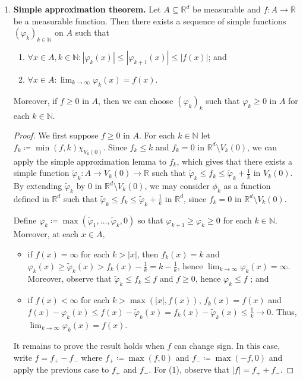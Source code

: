 \begin{enumerate}
\begin{proof}
	\end{proof}
\item \textbf{Simple approximation theorem.} Let \( A \subseteq \mathbb{R}^{d}  \) be measurable and \( f : A \to \overline{\mathbb{R}} \) be a measurable function. Then there exists a sequence of simple functions \( (\varphi _k)_{k \in \mathbb{N} }  \) on \( A \) such that
\begin{enumerate}
	\item \(\forall x \in A, k \in \mathbb{N} : |\varphi _k(x)| \leq |\varphi _{k+1}(x) | \leq |f(x)| \); and
	\item \(\forall x \in A : \lim_{{k} \to {\infty}} \varphi _k(x) = f(x) \).
\end{enumerate}
Moreover, if \( f \geq 0 \) in \( A \), then we can choose \(( \varphi _k )_k\) such that \( \varphi _k \geq 0 \) in \( A \) for each \( k \in \mathbb{N}  \).
\begin{proof}\renewcommand{\qedsymbol}{}
We first suppose \( f \geq 0 \) in \( A \). For each \( k \in \mathbb{N}  \) let \( f_k\coloneqq \min (f,k)\chi_{V_{k} (0)}  \). Since \( f_k \leq k  \) and \( f_k = 0 \) in \( \mathbb{R}^{d} \setminus V_k(0) \), we can apply the simple approximation lemma to \( f_k \), which gives that there exists a simple function \( \tilde{\varphi}_k : A \to V_k(0) \to \mathbb{R} \) such that \( \tilde{\varphi}_k \leq f_k \leq \tilde{\varphi}_k + \frac{1}{k}  \) in \( V_k(0). \) By extending \( \tilde{\varphi}_k \) by 0 in \( \mathbb{R}^{d} \setminus V_k(0) \), we may consider \( \phi_k \) as a function defined in \( \mathbb{R}^{d}  \) such that \( \tilde{\varphi}_k \leq f_k \leq \tilde{\varphi}_k + \frac{1}{k}  \) in \( \mathbb{R}^{d}  \), since \( f_k = 0 \) in \( \mathbb{R}^{d} \setminus V_k(0) \).

Define \( \varphi _k \coloneqq \max (\tilde{\varphi}_1, \hdots , \tilde{\varphi}_k , 0) \) so that \( \varphi_{k+1} \geq \varphi _k \geq 0   \) for each \( k \in \mathbb{N}  \). Moreover, at each \(x \in A,\)
\begin{itemize}
	\item if \( f(x) = \infty \) for each \( k > |x| \), then \( f_k(x) = k \) and \( \varphi _k (x) \geq \tilde{\varphi }_k(x) > f_k(x) - \frac{1}{k} = k - \frac{1}{k}  \), hence \( \lim_{{k} \to {\infty}} \varphi _k (x) = \infty \). Moreover, observe that \( \tilde{\varphi }_k \leq f _k \leq f \) and \( f \geq 0 \), hence \( \varphi _k \leq f \)  ; and
	\item if \( f(x) < \infty \) for each \( k > \max (|x|, f(x)) \), \( f_k(x) = f(x) \) and \( f(x) - \varphi _k(x) \leq f(x) - \tilde{\varphi }_k(x) = f_k(x) - \tilde{\varphi}_k(x) \leq \frac{1}{k} \to 0  \). Thus, \( \lim_{{k} \to {\infty}} \varphi _k (x) = f(x) \).
\end{itemize}
It remains to prove the result holds when \( f \) can change sign. In this case, write \( f = f_+ - f_- \) where \( f_+ \coloneqq \max (f , 0) \) and \( f_- \coloneqq  \max(-f,0) \) and apply the previous case to \( f_+ \) and \( f_- \). For (1), observe that \( |f| = f_+ + f_- \).
\end{proof}
\end{enumerate}

